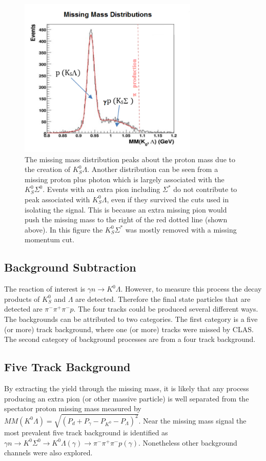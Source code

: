 \documentclass[prb,10pt,twocolumn,tightenlines,superscriptaddress]{revtex4-1}
\begin{document}
\begin{figure}[h]
    \centering
      \includegraphics[width=\linewidth, height = 3in, keepaspectratio = true]{MissingMass}
    \caption{The missing mass distribution peaks about the proton mass due to the creation of $K^{0}_{S}\Lambda$. Another distribution can be seen from a missing proton plus photon which is largely associated with the $K^{0}_{S}\Sigma^{0}$. Events with an extra pion including $\Sigma^{*}$ do not contribute to peak associated with $K^{0}_{S}\Lambda$, even if they survived the cuts used in isolating the signal. This is because an extra missing pion would push the missing mass to the right of the red dotted line (shown above). In this figure the $K^{0}_{S}\Sigma^{*}$ was mostly removed with a missing momentum cut.}
        \label{fig:7}%
\end{figure}

\subsection{Background Subtraction}
The reaction of interest is $\gamma n\rightarrow K^{0}\Lambda$. However, to measure this process the decay products of $K^{0}_{S}$ and $\Lambda$ are detected. Therefore the final state particles that are detected are $\pi^{-}\pi^{+}\pi^{-}p$. The four tracks could be produced several different ways. The backgrounds can be attributed to two categories. The first category is a five (or more) track background, where one (or more) tracks were missed by CLAS. The second category of background processes are from a four track background.

\subsection{Five Track Background} \label{sec:fiveparticleback}
By extracting the yield through the missing mass, it is likely that any process producing an extra pion (or other massive particle) is well separated from the spectator proton missing mass measured by $MM(K^{0}\Lambda) = \sqrt{(P_{d}+P_{\gamma} -P_{K^{0}} - P_{\Lambda})^{2}}$. Near the missing mass signal the most prevalent five track background is identified as $\gamma n \rightarrow K^{0}\Sigma^{0} \rightarrow K^{0}\Lambda(\gamma)\rightarrow \pi^{-}\pi^{+}\pi^{-}p(\gamma)$. Nonetheless other background channels were also explored.
\end{document}
